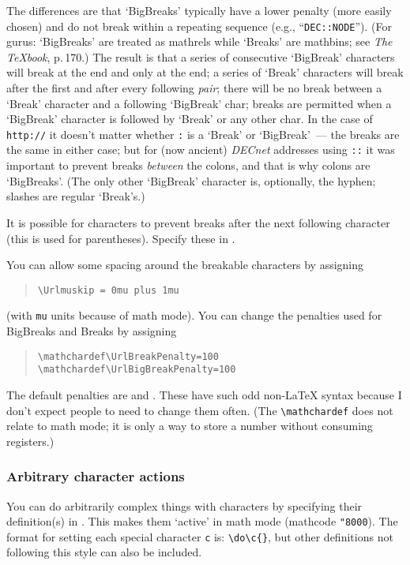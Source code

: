 \documentclass[a4paper,11pt]{article}
\begin{document}
The differences are that `BigBreaks' typically have a lower penalty (more
easily chosen) and do not break within a repeating sequence (e.g., 
``\verb+DEC::NODE+'').
(For gurus: `BigBreaks' are treated as mathrels while `Breaks' are mathbins;
see \textit{The TeXbook}, p.\,170.) The result is that a series of 
consecutive `BigBreak'
characters will break at the end and only at the end; a series of
`Break' characters will break after the first and after every following
\emph{pair}; there will be no break between a `Break' character and a
following `BigBreak' char; breaks are permitted when a `BigBreak' 
character is followed by `Break' or any other char.  In the case 
of \texttt{http://} it doesn't matter whether \texttt{:} is a 
`Break' or `BigBreak'~--- the breaks are the same in either case; but 
for (now ancient) \emph{DECnet} addresses using \texttt{::} it was
important to prevent breaks \emph{between} the colons, and that is why
colons are `BigBreaks'.  (The only other `BigBreak' character is,
optionally, the hyphen; slashes are regular `Break's.)

It is possible for characters to prevent breaks after the next
following character (this is used for parentheses).  Specify these in
.

You can allow some spacing around the breakable characters by assigning
\begin{quote}
\verb+\Urlmuskip = 0mu plus 1mu+
\end{quote}
(with \texttt{mu} units because of math mode).
You can change the penalties used for BigBreaks and Breaks by assigning
\begin{quote}
\verb+\mathchardef\UrlBreakPenalty=100+\\
\verb+\mathchardef\UrlBigBreakPenalty=100+
\end{quote}
The default penalties are  and .
These have such odd non-\LaTeX{} syntax because I don't expect people
to need to change them often. (The \verb+\mathchardef+ does not relate to 
math mode; it is only a way to store a number without consuming registers.)

\subsubsection{Arbitrary character actions}

You can do arbitrarily complex things with characters by specifying
their definition(s) in .  This makes them `active' in
math mode (mathcode \texttt{"8000}).  The format for setting
each special character \texttt{c} is:
\verb+\do\c{+\verb+}+, but other definitions not
following this style can also be included.
\end{document}
